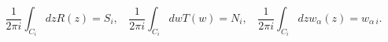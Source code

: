 \begin{equation}
\frac{1}{2\pi i}\int_{C_i}dz R(z) = S_i, ~~~~ \frac{1}{2\pi i}
\int_{C_i} dw T(w) = N_i, ~~~~\frac{1}{2\pi i}\int_{C_i}dz w_{\alpha}(z) =
w_{\alpha~i}.
\end{equation}

